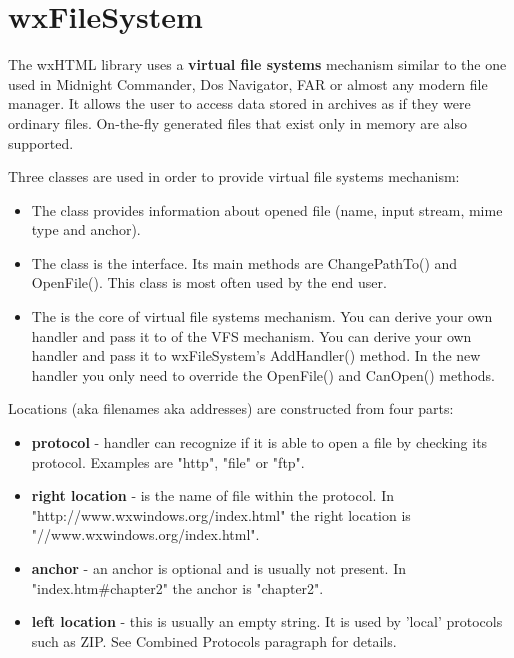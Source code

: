 \section{wxFileSystem}\label{fs}

The wxHTML library uses a {\bf virtual file systems} mechanism
similar to the one used in Midnight Commander, Dos Navigator,
FAR or almost any modern file manager. It allows the user to access
data stored in archives as if they were ordinary files. On-the-fly
generated files that exist only in memory are also supported.


Three classes are used in order to provide virtual file systems mechanism:

\begin{itemize}\itemsep=0pt
\item The  class provides information
about opened file (name, input stream, mime type and anchor).
\item The  class is the interface.
Its main methods are ChangePathTo() and OpenFile(). This class
is most often used by the end user.
\item The  is the core
of virtual file systems mechanism. You can derive your own handler and pass it to
of the VFS mechanism. You can derive your own handler and pass it to
wxFileSystem's AddHandler() method. In the new handler you only need to
override the OpenFile() and CanOpen() methods.
\end{itemize}


Locations (aka filenames aka addresses) are constructed from four parts:

\begin{itemize}\itemsep=0pt
\item {\bf protocol} - handler can recognize if it is able to open a
file by checking its protocol. Examples are "http", "file" or "ftp".
\item {\bf right location} - is the name of file within the protocol.
In "http://www.wxwindows.org/index.html" the right location is "//www.wxwindows.org/index.html".
\item {\bf anchor} - an anchor is optional and is usually not present.
In "index.htm\#chapter2" the anchor is "chapter2".
\item {\bf left location} - this is usually an empty string. 
It is used by 'local' protocols such as ZIP.
See Combined Protocols paragraph for details.
\end{itemize}

